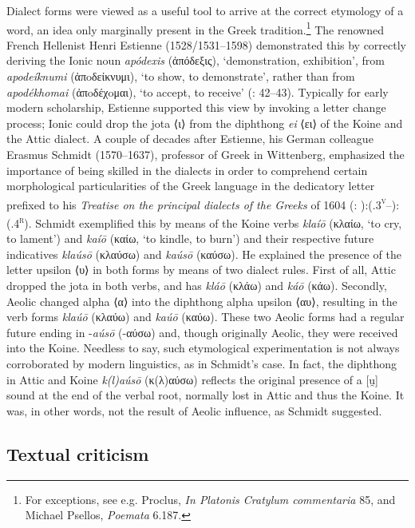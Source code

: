 Dialect forms were viewed as a useful tool to arrive at the correct etymology of a word, an idea only marginally present in the Greek tradition.\footnote{For exceptions, see e.g. Proclus, \textit{In Platonis Cratylum commentaria} 85, and Michael Psellos, \textit{Poemata} 6.187.} The renowned French Hellenist Henri Estienne (1528/1531–1598) demonstrated this by correctly deriving the Ionic noun \textit{apódexis} (ἀπόδεξις), ‘demonstration, exhibition’, from \textit{apodeíknumi} (ἀπoδείκνυμι), ‘to show, to demonstrate’, rather than from \textit{apodékhomai} (ἀπoδέχoμαι), ‘to accept, to receive’ (\citealt{Estienne1581}: 42–43). Typically for early modern scholarship, Estienne supported this view by invoking a letter change process; Ionic could drop the jota ⟨ι⟩ from the diphthong \textit{ei} ⟨ει⟩ of the Koine and the Attic dialect. A couple of decades after Estienne, his German colleague Erasmus Schmidt (1570–1637), professor of Greek in Wittenberg, emphasized the importance of being skilled in the dialects in order to comprehend certain morphological particularities of the Greek language in the dedicatory letter prefixed to his \textit{Treatise on the principal dialects of the Greeks} of 1604 (\citealt{Schmidt1604}: {\footnotesize{):(}}.3\textsc{\textsuperscript{v}}–{\footnotesize{):(}}.4\textsc{\textsuperscript{r}}). Schmidt exemplified this by means of the Koine verbs \textit{klaíō} (κλαίω, ‘to cry, to lament’) and \textit{kaíō} (καίω, ‘to kindle, to burn’) and their respective future indicatives \textit{klaúsō} (κλαύσω) and \textit{kaúsō} (καύσω). He explained the presence of the letter upsilon ⟨υ⟩ in both forms by means of two dialect rules. First of all, Attic dropped the jota in both verbs, and has \textit{kláō} (κλάω) and \textit{káō} (κάω). Secondly, Aeolic changed alpha ⟨α⟩ into the diphthong alpha upsilon ⟨αυ⟩, resulting in the verb forms \textit{klaúō} (κλαύω) and \textit{kaúō} (καύω). These two Aeolic forms had a regular future ending in -\textit{aúsō} (-αύσω) and, though originally Aeolic, they were received into the Koine. Needless to say, such etymological experimentation is not always corroborated by modern linguistics, as in Schmidt’s case.{} In fact, the diphthong in Attic and Koine \textit{k(l)aúsō} (κ(λ)αύσω) reflects the original presence of a [u̯] sound at the end of the verbal root, normally lost in Attic and thus the Koine. It was, in other words, not the result of Aeolic influence, as Schmidt suggested.

\subsection{Textual criticism}

